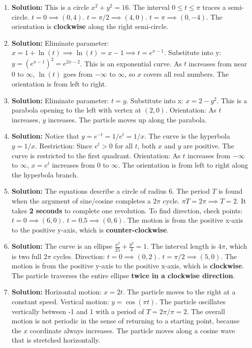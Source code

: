 \documentclass{article}
\begin{document}
\begin{enumerate}
\item \textbf{Solution:} This is a circle $x^2+y^2=16$. The interval $0 \le t \le \pi$ traces a semi-circle.
$t=0 \implies (0, 4)$. $t=\pi/2 \implies (4, 0)$. $t=\pi \implies (0, -4)$.
The orientation is \textbf{clockwise} along the right semi-circle.

\item \textbf{Solution:} Eliminate parameter: $x=1+\ln(t) \implies \ln(t)=x-1 \implies t = e^{x-1}$.
Substitute into y: $y = (e^{x-1})^2 = e^{2x-2}$. This is an exponential curve.
As $t$ increases from near 0 to $\infty$, $\ln(t)$ goes from $-\infty$ to $\infty$, so $x$ covers all real numbers. The orientation is from left to right.

\item \textbf{Solution:} Eliminate parameter: $t=y$. Substitute into x: $x=2-y^2$. This is a parabola opening to the left with vertex at $(2,0)$.
Orientation: As $t$ increases, $y$ increases. The particle moves up along the parabola.

\item \textbf{Solution:} Notice that $y = e^{-t} = 1/e^t = 1/x$. The curve is the hyperbola $y=1/x$.
Restriction: Since $e^t > 0$ for all $t$, both $x$ and $y$ are positive. The curve is restricted to the first quadrant.
Orientation: As $t$ increases from $-\infty$ to $\infty$, $x=e^t$ increases from $0$ to $\infty$. The orientation is from left to right along the hyperbola branch.

\item \textbf{Solution:} The equations describe a circle of radius 6. The period $T$ is found when the argument of sine/cosine completes a $2\pi$ cycle.
$\pi T = 2\pi \implies T = 2$. It takes \textbf{2 seconds} to complete one revolution.
To find direction, check points: $t=0 \implies (6,0)$. $t=0.5 \implies (0,6)$. The motion is from the positive x-axis to the positive y-axis, which is \textbf{counter-clockwise}.

\item \textbf{Solution:} The curve is an ellipse $\frac{x^2}{25} + \frac{y^2}{4} = 1$. The interval length is $4\pi$, which is two full $2\pi$ cycles.
Direction: $t=0 \implies (0,2)$. $t=\pi/2 \implies (5,0)$. The motion is from the positive y-axis to the positive x-axis, which is \textbf{clockwise}.
The particle traverses the entire ellipse \textbf{twice in a clockwise direction}.

\item \textbf{Solution:} Horizontal motion: $x=2t$. The particle moves to the right at a constant speed.
Vertical motion: $y=\cos(\pi t)$. The particle oscillates vertically between -1 and 1 with a period of $T = 2\pi/\pi = 2$.
The overall motion is not periodic in the sense of returning to a starting point, because the $x$ coordinate always increases. The particle moves along a cosine wave that is stretched horizontally.


\end{enumerate}
\end{document}
